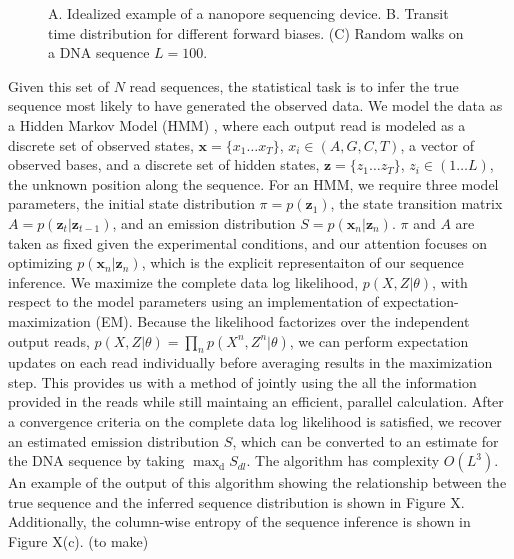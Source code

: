 \documentclass{biophys_letter}
\begin{document}
\twocolumn
\begin{figure}\vspace*{3pt}
\caption{A. Idealized example of a nanopore sequencing device. B. Transit time distribution for different forward biases. (C) Random walks on a DNA sequence $L=100$.}
\label{fig:fig1}
\end{figure}

Given this set of $N$ read sequences, the statistical task is to infer the true sequence most likely to have generated the observed data.
We model the data as a Hidden Markov Model (HMM) \cite{Rabiner:1989}, where each output read is modeled as a discrete set of observed states, $\mathbf{x}=\{x_{1}\dots x_{T}\}$, $x_i \in (A,G,C,T)$, a vector of observed bases, and a discrete set of hidden states, $\mathbf{z}=\{z_{1} \dots z_{T}\}$, $z_i \in (1 \dots L)$, the unknown position along the sequence.
For an HMM, we require three model parameters, the initial state distribution $\pi=p(\mathbf{z}_{1})$, the state transition matrix $A=p(\mathbf{z}_{t}|\mathbf{z}_{t-1})$, and an emission distribution $S=p(\mathbf{x}_{n}|\mathbf{z}_{n})$. 
$\pi$ and $A$ are taken as fixed given the experimental conditions, and our attention focuses on optimizing $p(\mathbf{x}_{n}|\mathbf{z}_{n})$, which is the explicit representaiton of our sequence inference.
We maximize the complete data log likelihood, $p(X,Z|\theta)$, with respect to the model parameters using an implementation of expectation-maximization (EM).
Because the likelihood factorizes over the independent output reads, $p(X,Z|\theta)=\prod_{n}p(X^n,Z^n|\theta)$, we can perform expectation updates on each read individually before averaging results in the maximization step.
This provides us with a method of jointly using the all the information provided in the reads while still maintaing an efficient, parallel calculation.
After a convergence criteria on the complete data log likelihood is satisfied, we recover an estimated emission distribution $S$, which can be converted to an estimate for the DNA sequence by taking $\mathrm{\max_{d}} {S_{dl}}$.
The algorithm has complexity $O(L^{3})$.
An example of the output of this algorithm showing the relationship between the true sequence and the inferred sequence distribution is shown in Figure X.
Additionally, the column-wise entropy of the sequence inference is shown in Figure X(c). (to make)
\end{document}
